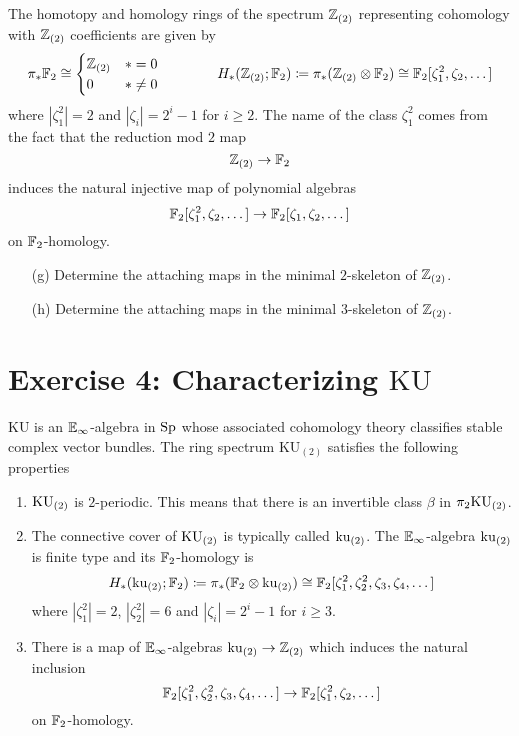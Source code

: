 \documentclass[reqno]{amsart}
\begin{document}
The homotopy and homology rings of the spectrum $\mathbb{Z}_{(2)}$ representing cohomology with $\mathbb{Z}_{(2)}$ coefficients are given by
\[ \pi_*\mathbb{F}_2 \cong \begin{cases} \mathbb{Z}_{(2)} & *=0 \\ 0 & *\neq 0 \end{cases} \qquad\qquad H_*(\mathbb{Z}_{(2)}; \mathbb{F}_2) \coloneqq \pi_*(\mathbb{Z}_{(2)} \otimes \mathbb{F}_2) \cong \mathbb{F}_2[\zeta_1^2, \zeta_2, \dots] \]
where $|\zeta_1^2| = 2$ and $|\zeta_i| = 2^{i} - 1$ for $i \geq 2$.
The name of the class $\zeta_1^2$ comes from the fact that the reduction mod $2$ map
\[ \mathbb{Z}_{(2)} \to \mathbb{F}_2 \]
induces the natural injective map of polynomial algebras
\[ \mathbb{F}_2[\zeta_1^2, \zeta_2, \dots] \to \mathbb{F}_2[\zeta_1, \zeta_2, \dots] \]
on $\mathbb{F}_2$-homology.

\begin{enumerate}
\item[(g)] Determine the attaching maps in the minimal $2$-skeleton of $\mathbb{Z}_{(2)}$.
\item[(h)] Determine the attaching maps in the minimal $3$-skeleton of $\mathbb{Z}_{(2)}$.
\end{enumerate}


\section{\bf Exercise 4: Characterizing $\mathrm{KU}$}

$\mathrm{KU}$ is an $\mathbb{E}_\infty$-algebra in $\mathrm{Sp}$ whose associated cohomology theory
classifies stable complex vector bundles.
The ring spectrum $\mathrm{KU}_{(2)}$ satisfies the following properties

\begin{enumerate}
\item $\mathrm{KU}_{(2)}$ is $2$-periodic.
  This means that there is an invertible class $\beta$ in $\pi_2\mathrm{KU}_{(2)}$.
\item The connective cover of $\mathrm{KU}_{(2)}$ is typically called $\mathrm{ku}_{(2)}$.
  The $\mathbb{E}_\infty$-algebra $\mathrm{ku}_{(2)}$ is finite type and 
  its $\mathbb{F}_2$-homology is
  \[ H_*(\mathrm{ku}_{(2)}; \mathbb{F}_2) \coloneqq \pi_*(\mathbb{F}_2 \otimes \mathrm{ku}_{(2)}) \cong \mathbb{F}_2[\zeta_1^{2}, \zeta_2^{2}, \zeta_3, \zeta_4, \dots ] \]
  where
  $|\zeta_1^{2}| = 2$,
  $|\zeta_2^{2}| = 6$
  and $|\zeta_i| = 2^{i} - 1$ for $i \geq 3$.
\item There is a map of $\mathbb{E}_\infty$-algebras $\mathrm{ku}_{(2)} \to \mathbb{Z}_{(2)}$ which induces the natural inclusion
  \[ \mathbb{F}_2[\zeta_1^{2}, \zeta_2^{2}, \zeta_3, \zeta_4, \dots ] \to \mathbb{F}_2[\zeta_1^2, \zeta_2, \dots] \]
  on $\mathbb{F}_2$-homology.
\end{enumerate}
\end{document}
